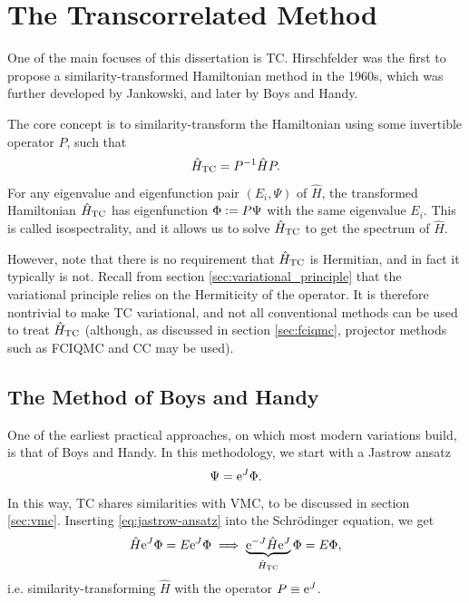 \section{The Transcorrelated Method}
\label{sec:tc}

One of the main focuses of this dissertation is \gls{TC}. Hirschfelder was the first to propose a similarity-transformed Hamiltonian method in the 1960s,\cite{hirschfelderRemoval1963} which was further developed by Jankowski,\supercite{Jankowski1967,Jankowski1970} and later by Boys and Handy.\supercite{boysCalculation1969,boysCondition1969,boysDetermination1969,boysFirst1969}

The core concept is to similarity-transform the Hamiltonian using some invertible operator $P$, such that
\begin{equation}
    \hat H_\mathrm{TC} = P^{-1}\hat HP.
\end{equation}
For any eigenvalue and eigenfunction pair $(E_i,\Psi)$ of $\hat H$, the transformed Hamiltonian $\hat H_\mathrm{TC}$ has eigenfunction $\Phi\mathrel{\mathop:}= P\Psi$ with the same eigenvalue $E_i$. This is called isospectrality, and it allows us to solve $\hat H_\mathrm{TC}$ to get the spectrum of $\hat H$.

However, note that there is no requirement that $\hat H_\mathrm{TC}$ is Hermitian, and in fact it typically is not. Recall from section \ref{sec:variational_principle} that the variational principle relies on the Hermiticity of the operator. It is therefore nontrivial to make \gls{TC} variational, and not all conventional methods can be used to treat $\hat H_\mathrm{TC}$ (although, as discussed in section \ref{sec:fciqmc}, projector methods such as FCIQMC and CC may be used).

\subsection{The Method of Boys and Handy}

One of the earliest practical approaches, on which most modern variations build, is that of Boys and Handy.\supercite{boysCalculation1969,boysCondition1969,boysDetermination1969,boysFirst1969} In this methodology, we start with a Jastrow ansatz\cite{jastrowManyBody1955}
\begin{equation}
    \label{eq:jastrow-ansatz}
    \Psi = \mathrm{e}^J\Phi.
\end{equation}
In this way, TC shares similarities with \gls{VMC}, to be discussed in section \ref{sec:vmc}. Inserting \ref{eq:jastrow-ansatz} into the Schrödinger equation, we get
\begin{equation}
    \hat H \mathrm{e}^J\Phi = E\mathrm{e}^J\Phi \implies \underbrace{\mathrm{e}^{-J}\hat H\mathrm{e}^J}_{\hat H_\mathrm{TC}}\Phi = E\Phi,
\end{equation}
i.e. similarity-transforming $\hat H$ with the operator $P\equiv\mathrm{e}^J$.

